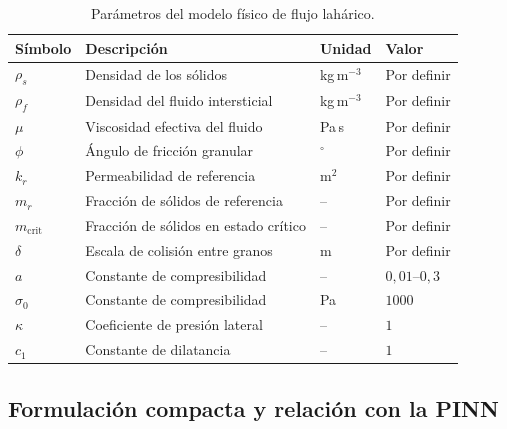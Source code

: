 \begin{table}[htbp]
    \centering
    \caption{Parámetros del modelo físico de flujo lahárico.}
    \label{tab:parametros_modelo}
    \begin{tabular}{>{\raggedright\arraybackslash}p{}
                    >{\raggedright\arraybackslash}p{}
                    >{\raggedright\arraybackslash}p{}
                    >{\raggedright\arraybackslash}p{}}
        \toprule
        \textbf{Símbolo} & \textbf{Descripción} & \textbf{Unidad} & \textbf{Valor} \\
        \midrule
        $\rho_s$ & Densidad de los sólidos & kg\,m$^{-3}$ & Por definir \\
        $\rho_f$ & Densidad del fluido intersticial & kg\,m$^{-3}$ & Por definir \\
        $\mu$ & Viscosidad efectiva del fluido & Pa\,s & Por definir \\
        $\phi$ & Ángulo de fricción granular & $^\circ$ & Por definir \\
        $k_r$ & Permeabilidad de referencia & m$^2$ & Por definir \\
        $m_r$ & Fracción de sólidos de referencia & -- & Por definir \\
        $m_{\mathrm{crit}}$ & Fracción de sólidos en estado crítico & -- & Por definir \\
        $\delta$ & Escala de colisión entre granos & m & Por definir \\
        $a$ & Constante de compresibilidad & -- & $0{,}01$--$0{,}3$ \cite{george2025d} \\
        $\sigma_0$ & Constante de compresibilidad & Pa & $1000$ \cite{george2025d} \\
        $\kappa$ & Coeficiente de presión lateral & -- & $1$ \cite{george2025d} \\
        $c_1$ & Constante de dilatancia & -- & $1$ \cite{george2025d} \\
        \bottomrule
    \end{tabular}
\end{table}


\subsection{Formulación compacta y relación con la PINN}
\label{subsec:forma_compacta}

